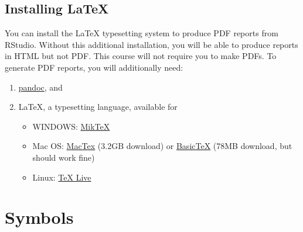 \documentclass[
  oneside]{book}
\providecommand{\tightlist}{%
  \setlength{\itemsep}{0pt}\setlength{\parskip}{0pt}}
\begin{document}
\hypertarget{installing-latex}{%
\section{Installing LaTeX}\label{installing-latex}}

You can install the LaTeX typesetting system to produce PDF reports from RStudio. Without this additional installation, you will be able to produce reports in HTML but not PDF. This course will not require you to make PDFs. To generate PDF reports, you will additionally need:

\begin{enumerate}
\def\labelenumi{\arabic{enumi}.}
\tightlist
\item
  \href{http://pandoc.org/installing.html}{pandoc}, and
\item
  LaTeX, a typesetting language, available for

  \begin{itemize}
  \tightlist
  \item
    WINDOWS: \href{http://miktex.org/}{MikTeX}
  \item
    Mac OS: \href{https://tug.org/mactex/downloading.html}{MacTex} (3.2GB download) or \href{http://ww.tug.org/mactex/morepackages.html}{BasicTeX} (78MB download, but should work fine)
  \item
    Linux: \href{https://www.tug.org/texlive/}{TeX Live}
  \end{itemize}
\end{enumerate}

\hypertarget{symbols}{%
\chapter{Symbols}\label{symbols}}
\end{document}
